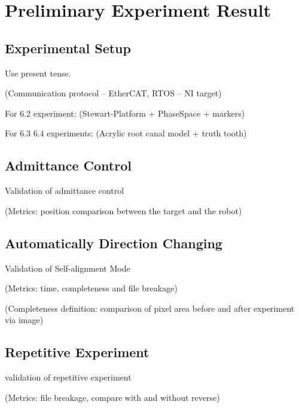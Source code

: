 \chapter{Preliminary Experiment Result}
\section{Experimental Setup}
Use present tense.\par\noindent
(Communication protocol – EtherCAT, RTOS – NI target)						
\par\noindent
For 6.2 experiment: (Stewart-Platform + PhaseSpace + markers)				
\par\noindent
For 6.3 6.4 experiments: (Acrylic root canal model + truth tooth)
\section{Admittance Control}
Validation of admittance control
\par\noindent
(Metrics: position comparison between the target and the robot)
\section{Automatically Direction Changing}
Validation of Self-alignment Mode
\par\noindent
(Metrics: time, completeness and file breakage)								
\par\noindent
(Completeness definition: comparison of pixel area before and after experiment via image)
\section{Repetitive Experiment}
validation of repetitive experiment
\par\noindent
(Metrics: file breakage, compare with and without reverse)